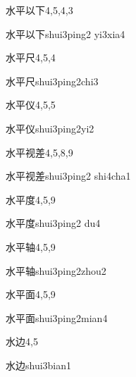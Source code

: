 \begin{entry}{水平以下}{4,5,4,3}
  \begin{phonetics}{水平以下}{shui3ping2 yi3xia4}
  \end{phonetics}
\end{entry}

\begin{entry}{水平尺}{4,5,4}
  \begin{phonetics}{水平尺}{shui3ping2chi3}
  \end{phonetics}
\end{entry}

\begin{entry}{水平仪}{4,5,5}
  \begin{phonetics}{水平仪}{shui3ping2yi2}
  \end{phonetics}
\end{entry}

\begin{entry}{水平视差}{4,5,8,9}
  \begin{phonetics}{水平视差}{shui3ping2 shi4cha1}
  \end{phonetics}
\end{entry}

\begin{entry}{水平度}{4,5,9}
  \begin{phonetics}{水平度}{shui3ping2 du4}
  \end{phonetics}
\end{entry}

\begin{entry}{水平轴}{4,5,9}
  \begin{phonetics}{水平轴}{shui3ping2zhou2}
  \end{phonetics}
\end{entry}

\begin{entry}{水平面}{4,5,9}
  \begin{phonetics}{水平面}{shui3ping2mian4}
  \end{phonetics}
\end{entry}

\begin{entry}{水边}{4,5}
  \begin{phonetics}{水边}{shui3bian1}
  \end{phonetics}
\end{entry}

